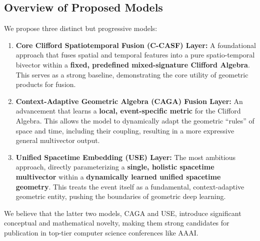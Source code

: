 \documentclass[11pt]{article}
\begin{document}
\subsection{Overview of Proposed Models}
We propose three distinct but progressive models:
\begin{enumerate}
    \item \textbf{Core Clifford Spatiotemporal Fusion (C-CASF) Layer:} A foundational approach that fuses spatial and temporal features into a pure spatio-temporal bivector within a \textbf{fixed, predefined mixed-signature Clifford Algebra}. This serves as a strong baseline, demonstrating the core utility of geometric products for fusion.
    \item \textbf{Context-Adaptive Geometric Algebra (CAGA) Fusion Layer:} An advancement that learns a \textbf{local, event-specific metric} for the Clifford Algebra. This allows the model to dynamically adapt the geometric ``rules'' of space and time, including their coupling, resulting in a more expressive general multivector output.
    \item \textbf{Unified Spacetime Embedding (USE) Layer:} The most ambitious approach, directly parameterizing a \textbf{single, holistic spacetime multivector} within a \textbf{dynamically learned unified spacetime geometry}. This treats the event itself as a fundamental, context-adaptive geometric entity, pushing the boundaries of geometric deep learning.
\end{enumerate}
We believe that the latter two models, CAGA and USE, introduce significant conceptual and mathematical novelty, making them strong candidates for publication in top-tier computer science conferences like AAAI.
\end{document}
